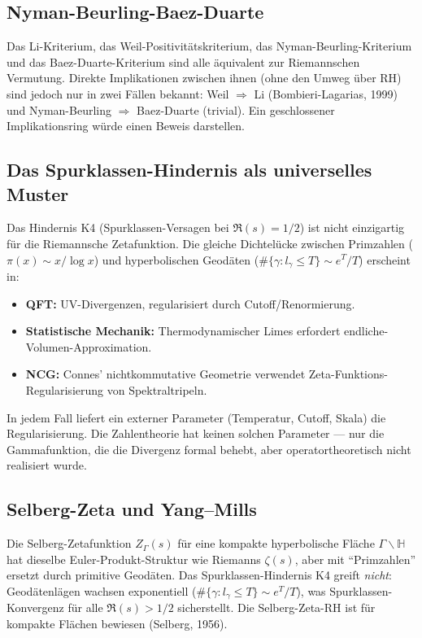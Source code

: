 \documentclass[12pt,a4paper]{article}
\theoremstyle{definition}
\theoremstyle{remark}
\begin{document}
\subsection{Nyman-Beurling-Baez-Duarte}

Das Li-Kriterium, das Weil-Positivitätskriterium, das Nyman-Beurling-Kriterium und das Baez-Duarte-Kriterium sind alle äquivalent zur Riemannschen Vermutung. Direkte Implikationen zwischen ihnen (ohne den Umweg über RH) sind jedoch nur in zwei Fällen bekannt: Weil $\Rightarrow$ Li (Bombieri-Lagarias, 1999) und Nyman-Beurling $\Rightarrow$ Baez-Duarte (trivial). Ein geschlossener Implikationsring würde einen Beweis darstellen.

\subsection{Das Spurklassen-Hindernis als universelles Muster}

Das Hindernis K4 (Spurklassen-Versagen bei $\Re(s) = 1/2$) ist nicht einzigartig für die Riemannsche Zetafunktion. Die gleiche Dichtelücke zwischen Primzahlen ($\pi(x) \sim x/\log x$) und hyperbolischen Geodäten ($\#\{\gamma: l_\gamma \leq T\} \sim e^T/T$) erscheint in:
\begin{itemize}
  \item \textbf{QFT:} UV-Divergenzen, regularisiert durch Cutoff/Renormierung.
  \item \textbf{Statistische Mechanik:} Thermodynamischer Limes erfordert endliche-Volumen-Approximation.
  \item \textbf{NCG:} Connes' nichtkommutative Geometrie verwendet Zeta-Funktions-Regularisierung von Spektraltripeln.
\end{itemize}
In jedem Fall liefert ein externer Parameter (Temperatur, Cutoff, Skala) die Regularisierung. Die Zahlentheorie hat keinen solchen Parameter --- nur die Gammafunktion, die die Divergenz formal behebt, aber operatortheoretisch nicht realisiert wurde.

\subsection{Selberg-Zeta und Yang--Mills}

Die Selberg-Zetafunktion $Z_\Gamma(s)$ für eine kompakte hyperbolische Fläche $\Gamma \backslash \mathbb{H}$ hat dieselbe Euler-Produkt-Struktur wie Riemanns $\zeta(s)$, aber mit ``Primzahlen'' ersetzt durch primitive Geodäten. Das Spurklassen-Hindernis K4 greift \emph{nicht}: Geodätenlägen wachsen exponentiell ($\#\{\gamma: l_\gamma \leq T\} \sim e^T/T$), was Spurklassen-Konvergenz für alle $\Re(s) > 1/2$ sicherstellt. Die Selberg-Zeta-RH ist für kompakte Flächen bewiesen (Selberg, 1956).
\end{document}
